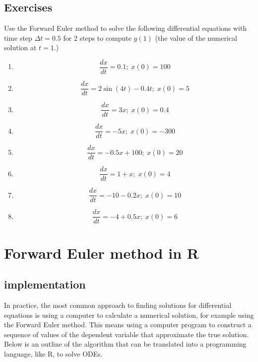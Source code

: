 \documentclass[
]{book}
\theoremstyle{definition}
\theoremstyle{definition}
\theoremstyle{definition}
\theoremstyle{remark}
\begin{document}
\hypertarget{exercises-16}{%
\subsection{Exercises}\label{exercises-16}}

Use the Forward Euler method to solve the following differential equations with time step \(\Delta t=0.5\) for 2 steps to compute \(y(1)\) (the value of the numerical solution at \(t=1\).)

\begin{enumerate}
\def\labelenumi{\arabic{enumi}.}
\item
  \[ \frac{dx}{dt} = 0.1; \; x(0)= 100 \]
\item
  \[ \frac{dx}{dt} =  2\sin(4t) -0.4t; \; x(0)= 5 \]
\item
  \[ \frac{dx}{dt} = 3x; \; x(0) = 0.4 \]
\item
  \[ \frac{dx}{dt} = -5x; \;  x(0) = -300 \]
\item
  \[ \frac{dx}{dt} = -0.5x + 100 ; \; x(0) = 20 \]
\item
  \[ \frac{dx}{dt} =  1 + x; \; x(0) = 4 \]
\item
  \[ \frac{dx}{dt} =  -10 - 0.2x; \; x(0) = 10 \]
\item
  \[ \frac{dx}{dt} =  -4 + 0.5x; \; x(0) = 6 \]
\end{enumerate}

\hypertarget{forward-euler-method-in-r}{%
\section{Forward Euler method in R}\label{forward-euler-method-in-r}}

\label{sec:comp16}

\hypertarget{implementation}{%
\subsection{implementation}\label{implementation}}

In practice, the most common approach to finding solutions for differential equations is using a computer to calculate a numerical solution, for example using the Forward Euler method. This means using a computer program to construct a sequence of values of the dependent variable that approximate the true solution. Below is an outline of the algorithm that can be translated into a programming language, like R, to solve ODEs.
\end{document}
